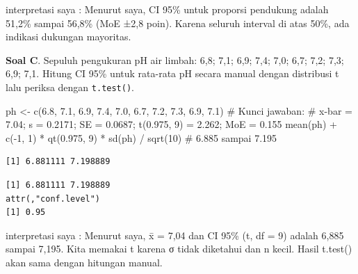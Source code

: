 \documentclass[
  indonesian,
  letterpaper,
]{book}
\newenvironment{Shaded}{\begin{snugshade}}{\end{snugshade}}
\newcommand{\CommentTok}[1]{\textcolor[rgb]{0.37,0.37,0.37}{#1}}
\newcommand{\DecValTok}[1]{\textcolor[rgb]{0.68,0.00,0.00}{#1}}
\newcommand{\FloatTok}[1]{\textcolor[rgb]{0.68,0.00,0.00}{#1}}
\newcommand{\FunctionTok}[1]{\textcolor[rgb]{0.28,0.35,0.67}{#1}}
\newcommand{\NormalTok}[1]{\textcolor[rgb]{0.00,0.23,0.31}{#1}}
\newcommand{\OtherTok}[1]{\textcolor[rgb]{0.00,0.23,0.31}{#1}}
\newcommand{\SpecialCharTok}[1]{\textcolor[rgb]{0.37,0.37,0.37}{#1}}
\begin{document}
interpretasi saya : Menurut saya, CI 95\% untuk proporsi pendukung
adalah 51,2\% sampai 56,8\% (MoE ±2,8 poin). Karena seluruh interval di
atas 50\%, ada indikasi dukungan mayoritas.

\textbf{Soal C}. Sepuluh pengukuran pH air limbah: 6,8; 7,1; 6,9; 7,4;
7,0; 6,7; 7,2; 7,3; 6,9; 7,1. Hitung CI 95\% untuk rata-rata pH secara
manual dengan distribusi t lalu periksa dengan \texttt{t.test()}.

\begin{Shaded}
\begin{Highlighting}[]
\NormalTok{ph }\OtherTok{\textless{}{-}} \FunctionTok{c}\NormalTok{(}\FloatTok{6.8}\NormalTok{, }\FloatTok{7.1}\NormalTok{, }\FloatTok{6.9}\NormalTok{, }\FloatTok{7.4}\NormalTok{, }\FloatTok{7.0}\NormalTok{, }\FloatTok{6.7}\NormalTok{, }\FloatTok{7.2}\NormalTok{, }\FloatTok{7.3}\NormalTok{, }\FloatTok{6.9}\NormalTok{, }\FloatTok{7.1}\NormalTok{)}
\CommentTok{\# Kunci jawaban:}
\CommentTok{\# x{-}bar = 7.04; s = 0.2171; SE = 0.0687; t(0.975, 9) = 2.262; MoE = 0.155}
\FunctionTok{mean}\NormalTok{(ph) }\SpecialCharTok{+} \FunctionTok{c}\NormalTok{(}\SpecialCharTok{{-}}\DecValTok{1}\NormalTok{, }\DecValTok{1}\NormalTok{) }\SpecialCharTok{*} \FunctionTok{qt}\NormalTok{(}\FloatTok{0.975}\NormalTok{, }\DecValTok{9}\NormalTok{) }\SpecialCharTok{*} \FunctionTok{sd}\NormalTok{(ph) }\SpecialCharTok{/} \FunctionTok{sqrt}\NormalTok{(}\DecValTok{10}\NormalTok{)   }\CommentTok{\# 6.885 sampai 7.195}
\end{Highlighting}
\end{Shaded}

\begin{verbatim}
[1] 6.881111 7.198889
\end{verbatim}

\begin{Shaded}
\end{Shaded}

\begin{verbatim}
[1] 6.881111 7.198889
attr(,"conf.level")
[1] 0.95
\end{verbatim}

interpretasi saya : Menurut saya, x̄ = 7,04 dan CI 95\% (t, df = 9)
adalah 6,885 sampai 7,195. Kita memakai t karena σ tidak diketahui dan n
kecil. Hasil t.test() akan sama dengan hitungan manual.
\end{document}

